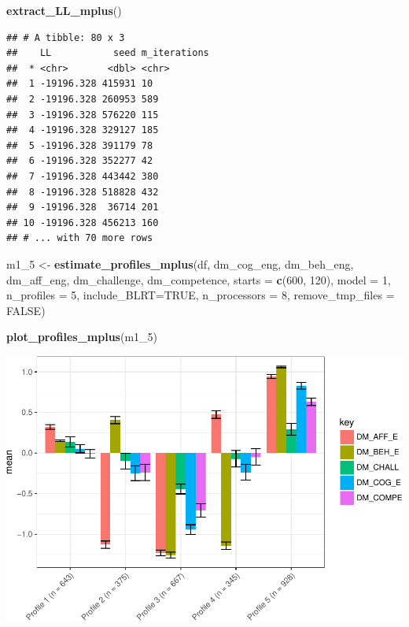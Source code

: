 \documentclass[]{msu-thesis}
\newenvironment{Shaded}{\begin{snugshade}}{\end{snugshade}}
\newcommand{\KeywordTok}[1]{\textcolor[rgb]{0.13,0.29,0.53}{\textbf{#1}}}
\newcommand{\DataTypeTok}[1]{\textcolor[rgb]{0.13,0.29,0.53}{#1}}
\newcommand{\DecValTok}[1]{\textcolor[rgb]{0.00,0.00,0.81}{#1}}
\newcommand{\StringTok}[1]{\textcolor[rgb]{0.31,0.60,0.02}{#1}}
\newcommand{\OtherTok}[1]{\textcolor[rgb]{0.56,0.35,0.01}{#1}}
\newcommand{\NormalTok}[1]{#1}
\theoremstyle{definition}
\theoremstyle{definition}
\theoremstyle{definition}
\theoremstyle{remark}
\begin{document}
\begin{Shaded}
\begin{Highlighting}[]
\KeywordTok{extract_LL_mplus}\NormalTok{()}
\end{Highlighting}
\end{Shaded}

\begin{verbatim}
## # A tibble: 80 x 3
##    LL           seed m_iterations
##  * <chr>       <dbl> <chr>       
##  1 -19196.328 415931 10          
##  2 -19196.328 260953 589         
##  3 -19196.328 576220 115         
##  4 -19196.328 329127 185         
##  5 -19196.328 391179 78          
##  6 -19196.328 352277 42          
##  7 -19196.328 443442 380         
##  8 -19196.328 518828 432         
##  9 -19196.328  36714 201         
## 10 -19196.328 456213 160         
## # ... with 70 more rows
\end{verbatim}

\begin{Shaded}
\begin{Highlighting}[]
\NormalTok{m1_}\DecValTok{5}\NormalTok{ <-}\StringTok{ }\KeywordTok{estimate_profiles_mplus}\NormalTok{(df,  }
\NormalTok{                             dm_cog_eng, dm_beh_eng, dm_aff_eng, dm_challenge, dm_competence,}
                             \DataTypeTok{starts =} \KeywordTok{c}\NormalTok{(}\DecValTok{600}\NormalTok{, }\DecValTok{120}\NormalTok{),}
                             \DataTypeTok{model =} \DecValTok{1}\NormalTok{,}
                             \DataTypeTok{n_profiles =} \DecValTok{5}\NormalTok{,}
                             \DataTypeTok{include_BLRT=}\OtherTok{TRUE}\NormalTok{,}
                             \DataTypeTok{n_processors =} \DecValTok{8}\NormalTok{, }\DataTypeTok{remove_tmp_files =} \OtherTok{FALSE}\NormalTok{)}

\KeywordTok{plot_profiles_mplus}\NormalTok{(m1_}\DecValTok{5}\NormalTok{)}
\end{Highlighting}
\end{Shaded}

\includegraphics{rosenberg-dissertation_files/figure-latex/spec-solutions-model1-3.pdf}
\end{document}
